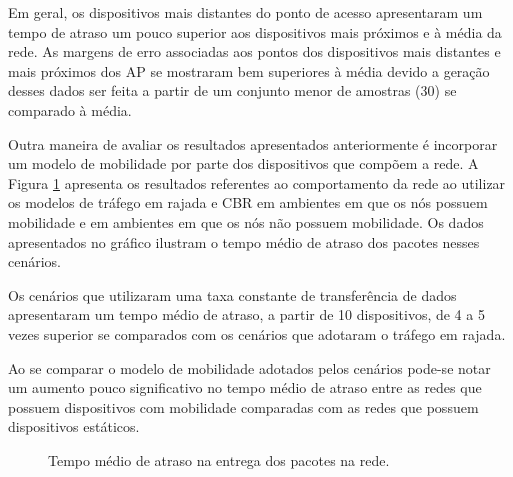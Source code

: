 \documentclass[12pt]{article}
\begin{document}
Em geral, os dispositivos mais distantes do ponto de acesso apresentaram um tempo de atraso um pouco superior aos dispositivos mais próximos e à média da rede. As margens de erro associadas aos pontos dos dispositivos mais distantes e mais próximos dos AP se mostraram bem superiores à média devido a geração desses dados ser feita a partir de um conjunto menor de amostras (30) se comparado à média.

Outra maneira de avaliar os resultados apresentados anteriormente é incorporar um modelo de mobilidade por parte dos dispositivos que compõem a rede. A Figura \ref{fig:delay_CBR_pulse} apresenta os resultados referentes ao comportamento da rede ao utilizar os modelos de tráfego em rajada e CBR em ambientes em que os nós possuem mobilidade e em ambientes em que os nós não possuem mobilidade. Os dados apresentados no gráfico ilustram o tempo médio de atraso dos pacotes nesses cenários.

Os cenários que utilizaram uma taxa constante de transferência de dados apresentaram um tempo médio de atraso, a partir de 10 dispositivos, de 4 a 5 vezes superior se comparados com os cenários que adotaram o tráfego em rajada.

Ao se comparar o modelo de mobilidade adotados pelos cenários pode-se notar um aumento pouco significativo no tempo médio de atraso entre as redes que possuem dispositivos com mobilidade comparadas com as redes que possuem dispositivos estáticos.

\begin{figure}[H]
\begin{center}
{%
\setlength{\fboxsep}{2pt}%
\setlength{\fboxrule}{1pt}%
%
}
\end{center}
\caption{Tempo médio de atraso na entrega dos pacotes na rede.}
\label{fig:delay_CBR_pulse}
\end{figure}
\end{document}
